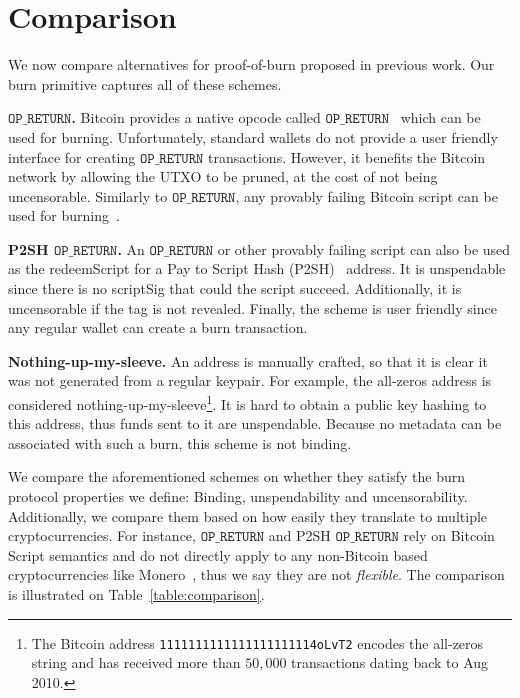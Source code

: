 \section{Comparison}

We now compare alternatives for proof-of-burn proposed in previous work. Our burn primitive captures all of these schemes.

\newcommand{\opreturn}{\texttt{OP\_RETURN}}

\noindent
\textbf{$\opreturn$.}
Bitcoin provides a native opcode called  $\opreturn$~\cite{bartoletti2017analysis} which can be used for burning.
Unfortunately,
standard wallets do not provide a user friendly interface for creating $\opreturn$ transactions.
However, it benefits the Bitcoin network by allowing the UTXO to be pruned, at
the cost of not being uncensorable.
Similarly to $\opreturn$, any provably failing Bitcoin script can be used for
burning~\cite{stewart}.

\noindent
\textbf{P2SH $\opreturn$.}
An $\opreturn$ or other provably failing script can also be used as the redeemScript for a Pay to Script Hash (P2SH)~\cite{p2sh} address. It is unspendable since there is no scriptSig that could the script succeed. Additionally, it is uncensorable if the tag is not revealed. Finally, the scheme is user friendly since any regular wallet can create a burn transaction.

\noindent
\textbf{Nothing-up-my-sleeve.}
An address is manually crafted, so that it is clear it was not generated from a regular keypair. For example, the all-zeros address is considered nothing-up-my-sleeve\footnote{The Bitcoin address \texttt{1111111111111111111114oLvT2} encodes the all-zeros string and has received more than $50{,}000$ transactions dating back to Aug 2010.}. It is hard to obtain a public key hashing to this address, thus funds sent to it are unspendable. Because no metadata can be associated with such a burn, this scheme is not binding.

We compare the aforementioned schemes on whether they satisfy the burn protocol properties we define: Binding, unspendability and uncensorability. Additionally, we compare them based on how easily they translate to multiple cryptocurrencies. For instance, $\opreturn$ and P2SH $\opreturn$ rely on Bitcoin Script semantics and do not directly apply to any non-Bitcoin based cryptocurrencies like Monero~\cite{van2013cryptonote}, thus we say they are not \emph{flexible}. The comparison is illustrated on Table~\ref{table:comparison}.

